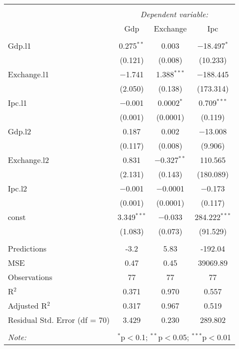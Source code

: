
\begin{table}[H] \centering 
  \caption{} 
  \label{tb:var2} 
\begin{tabular}{@{\extracolsep{5pt}}lccc} 
\\[-1.8ex]\hline 
\hline \\[-1.8ex] 
 & \multicolumn{3}{c}{\textit{Dependent variable:}} \\ 
\cline{2-4} 
 & Gdp & Exchange & Ipc \\ 
\hline \\[-1.8ex] 
 Gdp.l1 & 0.275$^{**}$ & 0.003 & $-$18.497$^{*}$ \\ 
  & (0.121) & (0.008) & (10.233) \\ 
  Exchange.l1 & $-$1.741 & 1.388$^{***}$ & $-$188.445 \\ 
  & (2.050) & (0.138) & (173.314) \\ 
  Ipc.l1 & $-$0.001 & 0.0002$^{*}$ & 0.709$^{***}$ \\ 
  & (0.001) & (0.0001) & (0.119) \\ 
  Gdp.l2 & 0.187 & 0.002 & $-$13.008 \\ 
  & (0.117) & (0.008) & (9.906) \\ 
  Exchange.l2 & 0.831 & $-$0.327$^{**}$ & 110.565 \\ 
  & (2.131) & (0.143) & (180.089) \\ 
  Ipc.l2 & $-$0.001 & $-$0.0001 & $-$0.173 \\ 
  & (0.001) & (0.0001) & (0.117) \\ 
  const & 3.349$^{***}$ & $-$0.033 & 284.222$^{***}$ \\ 
  & (1.083) & (0.073) & (91.529) \\ 
 \hline \\[-1.8ex] 
Predictions & -3.2 & 5.83 & -192.04 \\ 
MSE & 0.47 & 0.45 & 39069.89 \\ 
Observations & 77 & 77 & 77 \\ 
R$^{2}$ & 0.371 & 0.970 & 0.557 \\ 
Adjusted R$^{2}$ & 0.317 & 0.967 & 0.519 \\ 
Residual Std. Error (df = 70) & 3.429 & 0.230 & 289.802 \\ 
\hline 
\hline \\[-1.8ex] 
\textit{Note:}  & \multicolumn{3}{r}{$^{*}$p$<$0.1; $^{**}$p$<$0.05; $^{***}$p$<$0.01} \\ 
\end{tabular} 
\end{table} 

